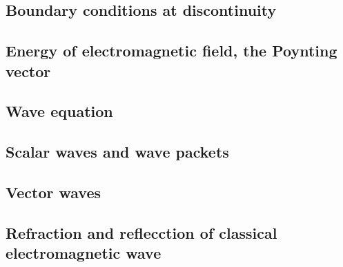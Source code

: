 \subsection{Boundary conditions at discontinuity}
\subsection{Energy of electromagnetic field, the Poynting vector}
\subsection{Wave equation}
\subsection{Scalar waves and wave packets}
\subsection{Vector waves}
\subsection{Refraction and reflecction of classical electromagnetic wave}
